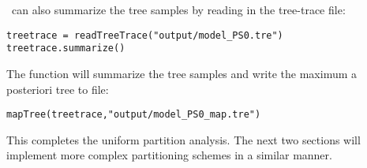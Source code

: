 \RevBayes~can also summarize the tree samples by reading in the tree-trace file:
{\tt \begin{snugshade*}
\begin{lstlisting}
treetrace = readTreeTrace("output/model_PS0.tre")
treetrace.summarize()
\end{lstlisting}
\end{snugshade*}}


The  function will summarize the tree samples and write the maximum a posteriori tree to file:
{\tt \begin{snugshade*}
\begin{lstlisting}
mapTree(treetrace,"output/model_PS0_map.tre")
\end{lstlisting}
\end{snugshade*}}

This completes the uniform partition analysis.
The next two sections will implement more complex partitioning schemes in a similar manner.

